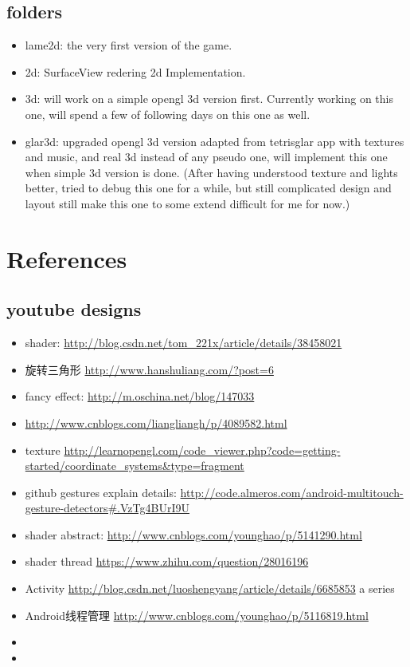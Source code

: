 \documentclass[9pt,b5paper]{article}
\begin{document}
\subsection{folders}
\label{sec-1-2}
\begin{itemize}
\item lame2d: the very first version of the game.
\item 2d: SurfaceView redering 2d Implementation.
\item 3d: will work on a simple opengl 3d version first. Currently working on this one, will spend a few of following days on this one as well.
\item glar3d: upgraded opengl 3d version adapted from tetrisglar app with textures and music, and real 3d instead of any pseudo one, will implement this one when simple 3d version is done. (After having understood texture and lights better, tried to debug this one for a while, but still complicated design and layout still make this one to some extend difficult for me for now.)
\end{itemize}

\section{References}
\label{sec-2}
\subsection{youtube designs}
\label{sec-2-1}
\begin{itemize}
\item shader: \url{http://blog.csdn.net/tom_221x/article/details/38458021}
\item 旋转三角形 \url{http://www.hanshuliang.com/?post=6}
\item fancy effect: \url{http://m.oschina.net/blog/147033}
\item \url{http://www.cnblogs.com/liangliangh/p/4089582.html}
\item texture \url{http://learnopengl.com/code_viewer.php?code=getting-started/coordinate_systems&type=fragment}
\item github gestures explain details: \url{http://code.almeros.com/android-multitouch-gesture-detectors#.VzTg4BUrI9U}
\item shader abstract: \url{http://www.cnblogs.com/younghao/p/5141290.html}
\item shader thread \url{https://www.zhihu.com/question/28016196}
\item Activity \url{http://blog.csdn.net/luoshengyang/article/details/6685853} a series
\item Android线程管理 \url{http://www.cnblogs.com/younghao/p/5116819.html}
\item 
\item 
\end{itemize}
\end{document}
